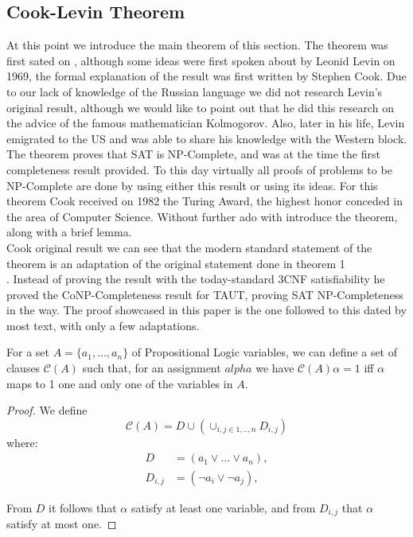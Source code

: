\subsection{Cook-Levin Theorem}
At this point we introduce the main theorem of this section. The theorem was first sated on \cite{cook1971complexity}, although some ideas were first spoken about by Leonid Levin on 1969, the formal explanation of the result was first written by Stephen Cook. Due to our lack of knowledge of the Russian language we did not research Levin's original result, although we would like to point out that he did this research on the advice of the famous mathematician Kolmogorov. Also, later in his life, Levin emigrated to the US and was able to share his knowledge with the Western block\cite{cvlevincook}.\\




The theorem proves that SAT is NP-Complete, and was at the time the first completeness result provided. To this day virtually all proofs of problems to be NP-Complete are done by using either this result or using its ideas. For this theorem Cook received on 1982 the Turing Award, the highest honor conceded in the area of Computer Science. Without further ado with introduce the theorem, along with a brief lemma.\\

 Cook original result we can see that the modern standard statement of the theorem is an adaptation of the original statement done in theorem 1\\ \cite{cook1971complexity}. Instead of proving the result with the today-standard 3CNF satisfiability he proved the CoNP-Completeness result for TAUT, proving SAT NP-Completeness in the way. The proof showcased in this paper is the one followed to this dated by most text, with only a few adaptations. 

\begin{lemma}
  For a set $A = \{a_1,...,a_n\}$ of Propositional Logic variables, we can define a set of clauses $\mathcal{C}(A)$ such that, for an assignment $alpha$ we have   $\mathcal{C}(A)\alpha = 1$ iff $\alpha$ maps to 1 one and only one of the variables in $A$.
\end{lemma}
\begin{proof}
  We define $$\mathcal{C}(A) = D\cup \left (  \cup_{i,j \in 1,..,n} D_{i,j} \right )$$ where:
  \begin{equation}
    \begin{split}
      D & = (a_1 \vee ... \vee a_n ),\\
      D_{i,j} & = (\neg a_{i} \vee \neg a_{j} ),
\end{split}
\end{equation}

From $D$ it follows that $\alpha$ satisfy at least one variable, and from $D_{i,j}$ that $\alpha$ satisfy at most one.
\end{proof}



